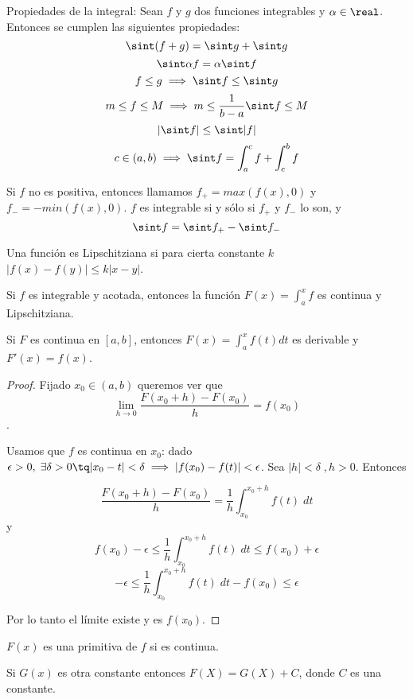 \documentclass[nochap]{apuntes}
\begin{document}
Propiedades de la integral: Sean $f$ y $g$ dos funciones integrables y $\alpha \in \real$. Entonces se cumplen las siguientes propiedades: \[\sint (f+g) = \sint g + \sint g \]
 \[ \sint \alpha f = \alpha \sint f \]
 \[ f\leq g \implies \sint f \leq \sint g \]
 \[m\leq f \leq M \implies m \leq \frac{1}{b-a}\sint f \leq M \]
 \[ \left|\sint f\right | \leq \sint |f| \]
 \[ c \in (a,b) \implies \sint  f= \int_a^c f + \int_c^b f \]

\begin{prop} Si $f$ no es positiva, entonces llamamos $f_+ = max(f(x),0)$ y $f_- = - min(f(x),0)$. $f$ es integrable si y sólo si $f_+$ y $f_-$ lo son, y \[\sint  f =\sint f_+ -\sint  f_-\]\end{prop}

\begin{defn}
Una función es Lipschitziana si para cierta constante $k$ $|f(x) - f(y)| \leq k |x-y|$.\end{defn}

\begin{theorem}
Si $f$ es integrable y acotada, entonces la función $F(x)=\int_a^x f$ es continua y Lipschitziana.
\end{theorem}

\begin{theorem}
Si $F$ es continua en $[a,b]$, entonces $F(x)=\int_a^x f(t) dt$ es derivable y $F'(x) = f(x)$.
\end{theorem}

\begin{proof}
Fijado $x_0\in (a,b)$ queremos ver que \[\lim_{h\to 0}\frac{F(x_0+h)-F(x_0)}{h}=f(x_0)\].

Usamos que $f$ es continua en $x_0$: dado $\epsilon>0, \; \exists \delta >0 \tq |x_0-t| < \delta \implies |f(x_0)-f(t)| < \epsilon$. Sea $|h| < \delta\; , h>0$. Entonces

\[ \frac{F(x_0+h)-F(x_0)}{h} = \frac{1}{h} \int_{x_0}^{x_0+h}f(t)\;dt \] y \[ f(x_0)-\epsilon \leq \frac{1}{h} \int_{x_0}^{x_0+h}f(t)\;dt \leq f(x_0) + \epsilon\] \[-\epsilon \leq \frac{1}{h} \int_{x_0}^{x_0+h}f(t)\;dt - f(x_0) \leq  \epsilon\]

Por lo tanto el límite existe y es $f(x_0)$.
\end{proof}

\begin{remark}$F(x)$ es una primitiva de $f$ si es continua.

Si $G(x)$ es otra constante entonces $F(X) = G(X) + C$, donde $C$ es una constante.\end{remark}
\end{document}
